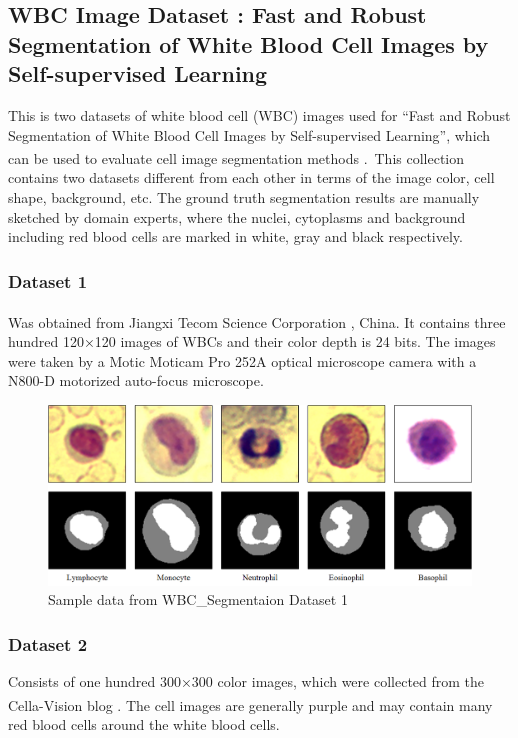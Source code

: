 \vspace{-0.1in}

\subsection{WBC Image Dataset : Fast and Robust Segmentation of White Blood Cell Images by Self-supervised Learning}
\hspace{\parindent}
This is two datasets of white blood cell (WBC) images used for “Fast and Robust Segmentation of White Blood Cell Images by Self-supervised Learning”, which can be used to evaluate cell image segmentation methods \textsuperscript{\cite{Zheng2018}}.\
This collection contains two datasets different from each other in terms of the image color, cell shape, background, etc. The ground truth segmentation results are manually sketched by domain experts, where the nuclei, cytoplasms and background including red blood cells are marked in white, gray and black respectively. 

\subsubsection{Dataset 1}
\hspace{\parindent}
Was obtained from Jiangxi Tecom Science Corporation \textsuperscript{\cite{2022_tecom-cn}}, China. It contains three hundred 120×120 images of WBCs and their color depth is 24 bits. The images were taken by a Motic Moticam Pro 252A optical microscope camera with a N800-D motorized auto-focus microscope.

\begin{figure}[H]
\centering
\includegraphics[width=5.2in]{../images/WBC_Dataset1.png}
\caption{Sample data from WBC\_Segmentaion Dataset 1}
\label{fig:WBC_Dataset1_sample}
\end{figure}

\subsubsection{Dataset 2}
Consists of one hundred 300×300 color images, which were collected from the Cella-Vision blog \textsuperscript{\cite{2022_cellavision}}. The cell images are generally purple and may contain many red blood cells around the white blood cells.

